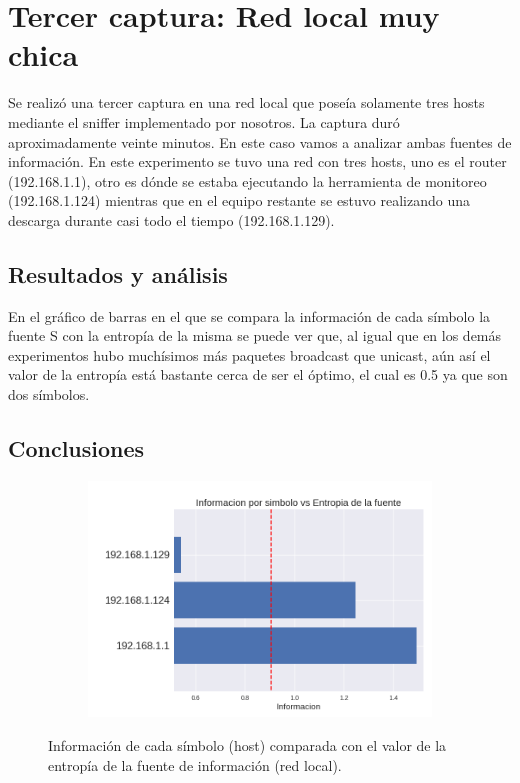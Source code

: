 \section{Tercer captura: Red local muy chica}
Se realizó una tercer captura en una red local que poseía solamente tres hosts mediante el sniffer implementado por nosotros. La captura duró aproximadamente veinte minutos. En este caso vamos a analizar ambas fuentes de información.
En este experimento se tuvo una red con tres hosts, uno es el router (192.168.1.1), otro es dónde se estaba ejecutando la herramienta de monitoreo (192.168.1.124) mientras que en el equipo restante se estuvo realizando una descarga durante casi todo el tiempo (192.168.1.129).
\subsection{Resultados y análisis}
En el gráfico de barras en el que se compara la información de cada símbolo la fuente S con la entropía de la misma se puede ver que, al igual que en los demás experimentos hubo muchísimos más paquetes broadcast que unicast, aún así el valor de la entropía está bastante cerca de ser el óptimo, el cual es 0.5 ya que son dos símbolos.

\subsection{Conclusiones}



\begin{figure}[h]
  \begin{subfigure}{.5\textwidth}
    \includegraphics[width=\textwidth]{imagenes/mini_red/mini_red_hosts.png}
  \end{subfigure}
  \label{fig:exp3_hosts_infovsentro}
  \caption{Información de cada símbolo (host) comparada con el valor de la entropía de la fuente de información (red local).}
\end{figure}


